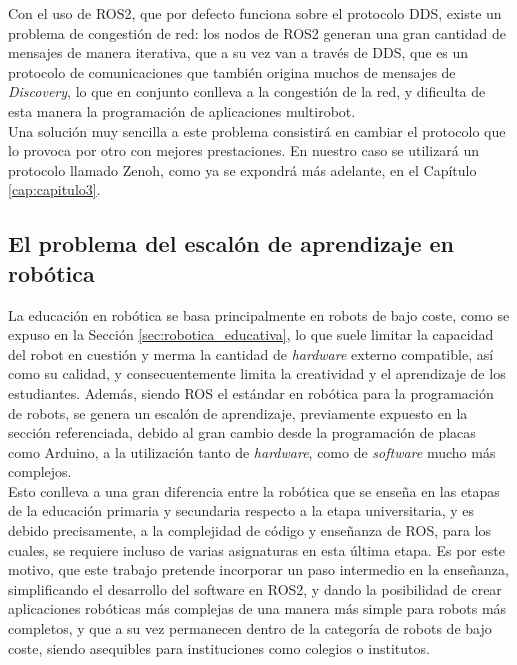 Con el uso de ROS2, que por defecto funciona sobre el protocolo DDS, existe un
problema de congestión de red: los nodos de ROS2 generan una gran cantidad de
mensajes de manera iterativa, que a su vez van a través de DDS, que es un
protocolo de comunicaciones que también origina muchos de mensajes de
\textit{Discovery}, lo que en conjunto conlleva a la congestión de la red, y
dificulta de esta manera la programación de aplicaciones multirobot.
\\

Una solución muy sencilla a este problema consistirá en cambiar el protocolo que
lo provoca por otro con mejores prestaciones.
En nuestro caso se utilizará un protocolo llamado Zenoh, como ya se expondrá más
adelante, en el Capítulo \ref{cap:capitulo3}.


\subsection{El problema del escalón de aprendizaje en robótica}
\label{sec:problema_escalon}

La educación en robótica se basa principalmente en robots de bajo coste, como se
expuso en la Sección \ref{sec:robotica_educativa}, lo que suele limitar la
capacidad del robot en cuestión y merma la cantidad de \textit{hardware} externo
compatible, así como su calidad, y consecuentemente limita la creatividad y el
aprendizaje de los estudiantes.
Además, siendo ROS el estándar en robótica para la programación de robots,
se genera un escalón de aprendizaje, previamente expuesto en la sección
referenciada, debido al gran cambio desde la programación de placas como
Arduino, a la utilización tanto de \textit{hardware}, como de \textit{software}
mucho más complejos.
\\

Esto conlleva a una gran diferencia entre la robótica que se enseña en las
etapas de la educación primaria y secundaria respecto a la etapa universitaria,
y es debido precisamente, a la complejidad de código y enseñanza de ROS, para
los cuales, se requiere incluso de varias asignaturas en esta última etapa.
Es por este motivo, que este trabajo pretende incorporar un paso intermedio en
la enseñanza, simplificando el desarrollo del software en ROS2, y dando la
posibilidad de crear aplicaciones robóticas más complejas de una manera más
simple para robots más completos, y que a su vez permanecen dentro de la
categoría de robots de bajo coste, siendo asequibles para instituciones como
colegios o institutos.


